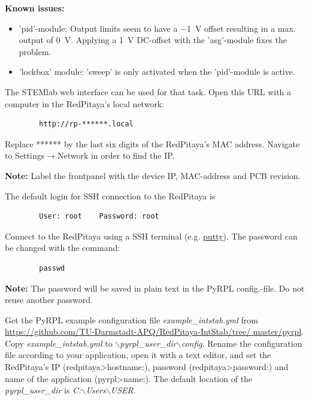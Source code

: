 \documentclass[twoside,a4paper]{refart}
\begin{document}
\textbf{Known issues:}
\begin{itemize}
	\item 'pid'-module: Output limits seem to have a \SI{-1}{\volt} offset resulting in a max. output of \SI{0}{\volt}. Applying a \SI{1}{\volt} DC-offset with the 'asg'-module fixes the problem.
	\item 'lockbox' module: 'sweep' is only activated when the 'pid'-module is active.
\end{itemize}   

The STEMlab web interface can be used for that task. Open this URL with a computer in the RedPitaya's local network:
\begin{tcolorbox}
	\begin{verbatim}
		http://rp-******.local
	\end{verbatim}
\end{tcolorbox}
Replace ****** by the last six digits of the RedPitaya's MAC address. Navigate to Settings$\rightarrow$Network in order to find the IP.

\textbf{Note:}
Label the frontpanel with the device IP, MAC-address and PCB revision.


 The default login for SSH connection to the RedPitaya is

\begin{tcolorbox}
	\begin{verbatim}
		User: root    Password: root
	\end{verbatim}
\end{tcolorbox}

Connect to the RedPitaya using a SSH terminal (e.g. \href{https://www.putty.org/}{putty}). The password can be changed with the command:
\begin{tcolorbox}
	\begin{verbatim}
		passwd
	\end{verbatim}
\end{tcolorbox}

\textbf{Note: }The password will be saved in plain text in the PyRPL config.-file. Do not reuse another password.

Get the PyRPL example configuration file \textit{example\_intstab.yml} from \href{https://github.com/TU-Darmstadt-APQ/RedPitaya-IntStab/tree/master/pyrpl}{https://github.com/TU-Darmstadt-APQ/RedPitaya-IntStab/tree/ master/pyrpl}. Copy \textit{example\_intstab.yml} to \textit{$\backslash$pyrpl\_user\_dir$\backslash$config}. Rename the configuration file according to your application, open it with a text editor, and set the RedPitaya's IP (redpitaya>hostname:), password  (redpitaya>password:) and name of the application (pyrpl>name:). The default location of the \textit{pyrpl\_user\_dir} is \textit{C:$\backslash$Users$\backslash$USER}.
\end{document}

